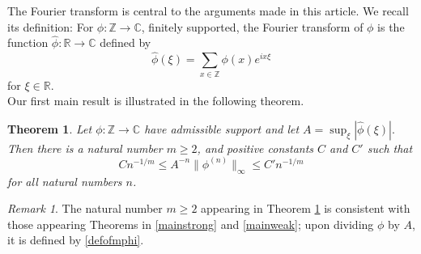 \documentclass{article}
\theoremstyle{theorem}
\newtheorem{theorem}{Theorem}[section]
\theoremstyle{remark}
\newtheorem{remark}{Remark}
\begin{document}
\vspace{1in}

\noindent The Fourier transform is central to the arguments made in this article. We recall its definition: For $\phi:\mathbb{Z}\rightarrow
\mathbb{C}$, finitely supported, the Fourier transform of $\phi$ is the function $\hat{\phi}:\mathbb{R}\rightarrow\mathbb{C}$ defined by
\begin{equation}\label{fouriertransform}
\hat{\phi}(\xi)=\sum_{x\in\mathbb{Z}}\phi(x)e^{ix\xi}
\end{equation}
for $\xi\in\mathbb{R}$.\\


\noindent Our first main result is illustrated in the following theorem.
\begin{theorem}\label{mainbound}
Let $\phi:\mathbb{Z}\rightarrow \mathbb{C}$ have admissible support and let 
$A=\sup_\xi|\hat{\phi}(\xi)|.$ Then there is a natural number $m\geq 2$, and positive constants $C$ and $C'$ such that
\begin{equation}\label{mainboundsupeq}
Cn^{-1/m}\leq A^{-n}\|\phi^{(n)}\|_{\infty}\leq C'n^{-1/m}
\end{equation}
for all natural numbers $n$.
\end{theorem}

\begin{remark}
The natural number $m\geq 2$ appearing in Theorem \ref{mainbound} is consistent with those appearing Theorems in \ref{mainstrong} and \ref{mainweak}; upon dividing $\phi$ by $A$, it is defined by \eqref{defofmphi}.
\end{remark}
\end{document}
